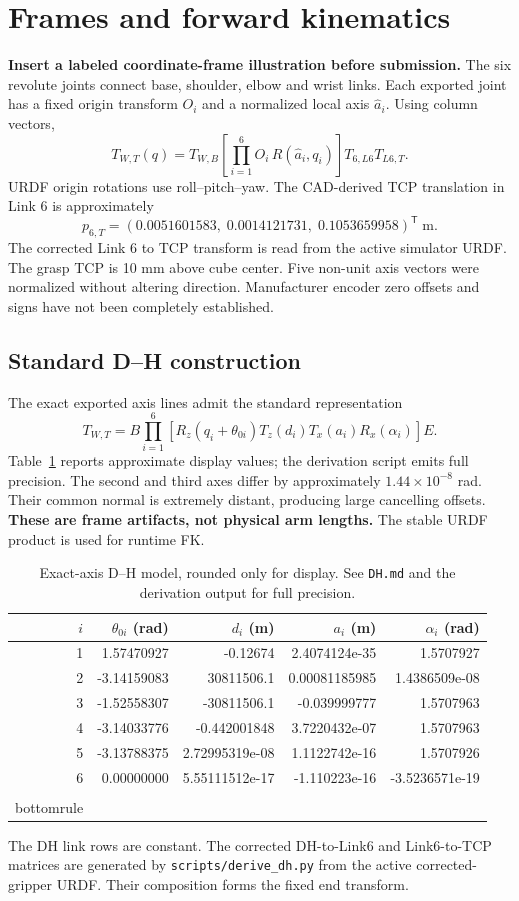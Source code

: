 \documentclass[11pt,a4paper]{article}
\begin{document}
\section{Frames and forward kinematics}
\textbf{Insert a labeled coordinate-frame illustration before submission.} The six revolute joints connect base, shoulder, elbow and wrist links. Each exported joint has a fixed origin transform $O_i$ and a normalized local axis $\hat a_i$. Using column vectors,
\begin{equation}
T_{W,T}(q)=T_{W,B}\left[\prod_{i=1}^{6}O_i\,R(\hat a_i,q_i)\right]T_{6,L6}T_{L6,T}.
\end{equation}
URDF origin rotations use roll--pitch--yaw. The CAD-derived TCP translation in Link 6 is approximately
\begin{equation}
p_{6,T}=(0.0051601583,\;0.0014121731,\;0.1053659958)^\mathsf T\;\mathrm{m}.
\end{equation}
The corrected Link 6 to TCP transform is read from the active simulator URDF. The grasp TCP is 10 mm above cube center. Five non-unit axis vectors were normalized without altering direction. Manufacturer encoder zero offsets and signs have not been completely established.
\subsection{Standard D--H construction}
The exact exported axis lines admit the standard representation
\begin{equation}
T_{W,T}=B\prod_{i=1}^{6}\left[R_z(q_i+\theta_{0i})T_z(d_i)T_x(a_i)R_x(\alpha_i)\right]E.
\end{equation}
Table~\ref{tab:dh} reports approximate display values; the derivation script emits full precision. The second and third axes differ by approximately $1.44\times10^{-8}$ rad. Their common normal is extremely distant, producing large cancelling offsets. \textbf{These are frame artifacts, not physical arm lengths.} The stable URDF product is used for runtime FK.
\begin{table}[h]\centering\small
\begin{tabular}{rrrrr}\toprule$i$&$\theta_{0i}$ (rad)&$d_i$ (m)&$a_i$ (m)&$\alpha_i$ (rad)\\\midrule
1&1.57470927&-0.12674&2.4074124e-35&1.5707927\\
2&-3.14159083&30811506.1&0.00081185985&1.4386509e-08\\
3&-1.52558307&-30811506.1&-0.039999777&1.5707963\\
4&-3.14033776&-0.442001848&3.7220432e-07&1.5707963\\
5&-3.13788375&2.72995319e-08&1.1122742e-16&1.5707926\\
6&0.00000000&5.55111512e-17&-1.110223e-16&-3.5236571e-19\\
\\bottomrule
\end{tabular}\caption{Exact-axis D--H model, rounded only for display. See \texttt{DH.md} and the derivation output for full precision.}\label{tab:dh}\end{table}
The DH link rows are constant. The corrected DH-to-Link6 and Link6-to-TCP matrices are generated by \texttt{scripts/derive\_dh.py} from the active corrected-gripper URDF. Their composition forms the fixed end transform.
\end{document}
